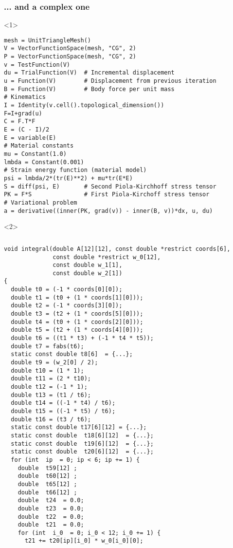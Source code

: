 \documentclass[presentation]{beamer}
\begin{document}
\begin{frame}[fragile]
  \frametitle{... and a complex one}
  \begin{onlyenv}<1>
\begin{verbatim}
mesh = UnitTriangleMesh()
V = VectorFunctionSpace(mesh, "CG", 2)
P = VectorFunctionSpace(mesh, "CG", 2)
v = TestFunction(V)
du = TrialFunction(V)  # Incremental displacement
u = Function(V)        # Displacement from previous iteration
B = Function(V)        # Body force per unit mass
# Kinematics
I = Identity(v.cell().topological_dimension())
F=I+grad(u)
C = F.T*F
E = (C - I)/2
E = variable(E)
# Material constants
mu = Constant(1.0)
lmbda = Constant(0.001)
# Strain energy function (material model) 
psi = lmbda/2*(tr(E)**2) + mu*tr(E*E)
S = diff(psi, E)       # Second Piola-Kirchhoff stress tensor
PK = F*S               # First Piola-Kirchoff stress tensor
# Variational problem
a = derivative((inner(PK, grad(v)) - inner(B, v))*dx, u, du)
\end{verbatim}
  \end{onlyenv}
  \begin{onlyenv}<2>
{\fontsize{3pt}{4pt}\selectfont
\begin{columns}
\begin{column}{0.5\textwidth}
\begin{verbatim}
void integral(double A[12][12], const double *restrict coords[6],
              const double *restrict w_0[12],
              const double w_1[1],
              const double w_2[1])
{
  double t0 = (-1 * coords[0][0]);
  double t1 = (t0 + (1 * coords[1][0]));
  double t2 = (-1 * coords[3][0]);
  double t3 = (t2 + (1 * coords[5][0]));
  double t4 = (t0 + (1 * coords[2][0]));
  double t5 = (t2 + (1 * coords[4][0]));
  double t6 = ((t1 * t3) + (-1 * t4 * t5));
  double t7 = fabs(t6);
  static const double t8[6]  = {...};
  double t9 = (w_2[0] / 2);
  double t10 = (1 * 1);
  double t11 = (2 * t10);
  double t12 = (-1 * 1);
  double t13 = (t1 / t6);
  double t14 = ((-1 * t4) / t6);
  double t15 = ((-1 * t5) / t6);
  double t16 = (t3 / t6);
  static const double t17[6][12] = {...};
  static const double  t18[6][12]  = {...};
  static const double  t19[6][12]  = {...};
  static const double  t20[6][12]  = {...};
  for (int  ip  = 0; ip < 6; ip += 1) {
    double  t59[12] ;
    double  t60[12] ;
    double  t65[12] ;
    double  t66[12] ;
    double  t24  = 0.0;
    double  t23  = 0.0;
    double  t22  = 0.0;
    double  t21  = 0.0;
    for (int  i_0  = 0; i_0 < 12; i_0 += 1) {
      t21 += t20[ip][i_0] * w_0[i_0][0];

\end{verbatim}
\end{column}
\end{columns}}
\end{onlyenv}
\end{frame}
\end{document}

